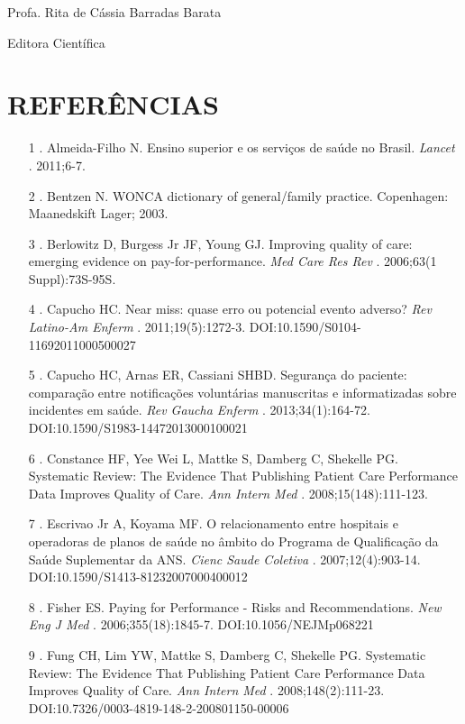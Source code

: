 \documentclass{article}
\begin{document}
Profa. Rita de Cássia Barradas Barata

Editora Científica

\section*{REFERÊNCIAS}
\begin{itemize}

\item[1] . Almeida-Filho N. Ensino superior e os serviços de saúde no Brasil.
\textit{Lancet}
. 2011;6-7.

\item[2] . Bentzen N. WONCA dictionary of general/family practice. Copenhagen:
Maanedskift Lager; 2003.

\item[3] . Berlowitz D, Burgess Jr JF, Young GJ. Improving quality of care:
emerging
evidence on pay-for-performance. \textit{Med Care Res Rev}
. 2006;63(1
Suppl):73S-95S.

\item[4] . Capucho HC. Near miss: quase erro ou potencial evento adverso?
\textit{Rev
Latino-Am Enferm}
. 2011;19(5):1272-3.
DOI:10.1590/S0104-11692011000500027

\item[5] . Capucho HC, Arnas ER, Cassiani SHBD. Segurança do paciente:
comparação
entre notificações voluntárias manuscritas e informatizadas sobre incidentes em
saúde.
\textit{Rev Gaucha Enferm}
. 2013;34(1):164-72.
DOI:10.1590/S1983-14472013000100021

\item[6] . Constance HF, Yee Wei L, Mattke S, Damberg C, Shekelle PG. Systematic
Review: The Evidence That Publishing Patient Care Performance Data Improves
Quality of
Care. \textit{Ann Intern Med}
. 2008;15(148):111-123.

\item[7] . Escrivao Jr A, Koyama MF. O relacionamento entre hospitais e
operadoras de
planos de saúde no âmbito do Programa de Qualificação da Saúde Suplementar da
ANS.
\textit{Cienc Saude Coletiva}
. 2007;12(4):903-14.
DOI:10.1590/S1413-81232007000400012

\item[8] . Fisher ES. Paying for Performance - Risks and Recommendations.
\textit{New
Eng J Med}
. 2006;355(18):1845-7. DOI:10.1056/NEJMp068221

\item[9] . Fung CH, Lim YW, Mattke S, Damberg C, Shekelle PG. Systematic Review:
The
Evidence That Publishing Patient Care Performance Data Improves Quality of Care.
\textit{Ann Intern Med}
. 2008;148(2):111-23.
DOI:10.7326/0003-4819-148-2-200801150-00006


\end{itemize}
\end{document}
